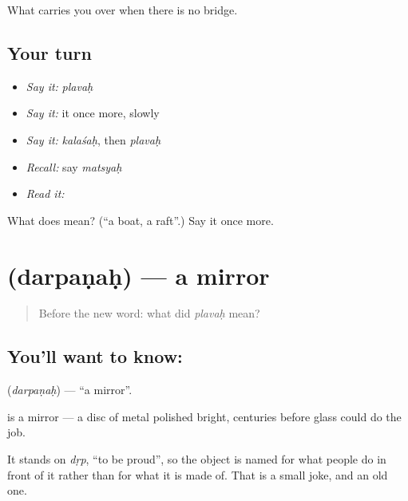 \begin{grammarlens}[title={What you've built}]
What carries you over when there is no bridge.
\end{grammarlens}

\subsection*{Your turn}
\begin{itemize}
\raggedright
  \item \emph{Say it:} \emph{plavaḥ}
  \item \emph{Say it:} it once more, slowly
  \item \emph{Say it:} \emph{kalaśaḥ}, then \emph{plavaḥ}
  \item \emph{Recall:} say \emph{matsyaḥ}
  \item \emph{Read it:} \textbf{}
\end{itemize}

\begin{tcolorbox}[breakable,colback=teal!4,colframe=teal!35!black,title={Before you move on}]
What does  mean? (\textquotedblleft{}a boat, a raft\textquotedblright{}.) Say it once more.
\end{tcolorbox}
\section[\texorpdfstring{\sk{दर्पणः} (darpaṇaḥ)}{दर्पणः (darpaṇaḥ)}]{ (darpaṇaḥ) — a mirror}

\label{lesson:SA-C41-mirror}



\begin{quote}
Before the new word: what did \emph{plavaḥ} mean?
\end{quote}

\subsection*{You'll want to know: }
\textbf{} (\emph{darpaṇaḥ}) — \textquotedblleft{}a mirror\textquotedblright{}.

\textbf{} is a mirror — a disc of metal polished bright, centuries before glass could do the job.

It stands on \emph{dṛp}, \textquotedblleft{}to be proud\textquotedblright{}, so the object is named for what people do in front of it rather than for what it is made of. That is a small joke, and an old one.

